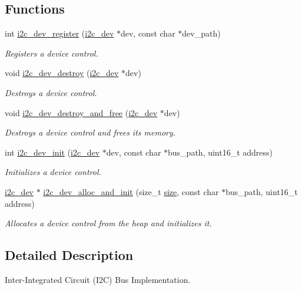 \subsection*{Functions}
\begin{DoxyCompactItemize}
\item 
int \mbox{\hyperlink{group__I2CDevice_ga917604be9f6cfaa0e4d7a9302e873d16}{i2c\+\_\+dev\+\_\+register}} (\mbox{\hyperlink{structi2c__dev}{i2c\+\_\+dev}} $\ast$dev, const char $\ast$dev\+\_\+path)
\begin{DoxyCompactList}\small\item\em Registers a device control. \end{DoxyCompactList}\item 
void \mbox{\hyperlink{group__I2CDevice_ga2ed20633d6ded213b3f06ca56db211c6}{i2c\+\_\+dev\+\_\+destroy}} (\mbox{\hyperlink{structi2c__dev}{i2c\+\_\+dev}} $\ast$dev)
\begin{DoxyCompactList}\small\item\em Destroys a device control. \end{DoxyCompactList}\item 
void \mbox{\hyperlink{group__I2CDevice_gabb0478e95d721b85cc8e06bd2be89559}{i2c\+\_\+dev\+\_\+destroy\+\_\+and\+\_\+free}} (\mbox{\hyperlink{structi2c__dev}{i2c\+\_\+dev}} $\ast$dev)
\begin{DoxyCompactList}\small\item\em Destroys a device control and frees its memory. \end{DoxyCompactList}\item 
int \mbox{\hyperlink{group__I2CDevice_ga240da9c0f736698756528ac98b790ca8}{i2c\+\_\+dev\+\_\+init}} (\mbox{\hyperlink{structi2c__dev}{i2c\+\_\+dev}} $\ast$dev, const char $\ast$bus\+\_\+path, uint16\+\_\+t address)
\begin{DoxyCompactList}\small\item\em Initializes a device control. \end{DoxyCompactList}\item 
\mbox{\hyperlink{structi2c__dev}{i2c\+\_\+dev}} $\ast$ \mbox{\hyperlink{group__I2CDevice_gaaa52883fe2313442f1172eb5f4de1215}{i2c\+\_\+dev\+\_\+alloc\+\_\+and\+\_\+init}} (size\+\_\+t \mbox{\hyperlink{sun4u_2tte_8h_a245260f6f74972558f61b85227df5aae}{size}}, const char $\ast$bus\+\_\+path, uint16\+\_\+t address)
\begin{DoxyCompactList}\small\item\em Allocates a device control from the heap and initializes it. \end{DoxyCompactList}\end{DoxyCompactItemize}


\subsection{Detailed Description}
Inter-\/\+Integrated Circuit (I2C) Bus Implementation. 

